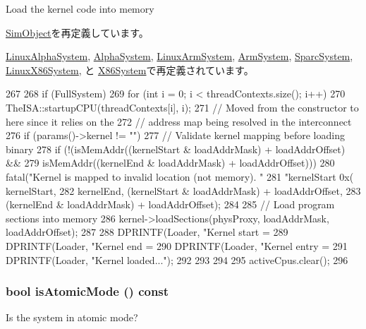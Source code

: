 Load the kernel code into memory

\hyperlink{classSimObject_a3c34ea9b29f410748d4435a667484924}{SimObject}を再定義しています。

\hyperlink{classLinuxAlphaSystem_a3c34ea9b29f410748d4435a667484924}{LinuxAlphaSystem}, \hyperlink{classAlphaSystem_a3c34ea9b29f410748d4435a667484924}{AlphaSystem}, \hyperlink{classLinuxArmSystem_a3c34ea9b29f410748d4435a667484924}{LinuxArmSystem}, \hyperlink{classArmSystem_a3c34ea9b29f410748d4435a667484924}{ArmSystem}, \hyperlink{classSparcSystem_a3c34ea9b29f410748d4435a667484924}{SparcSystem}, \hyperlink{classLinuxX86System_a3c34ea9b29f410748d4435a667484924}{LinuxX86System}, と \hyperlink{classX86System_a3c34ea9b29f410748d4435a667484924}{X86System}で再定義されています。


\begin{DoxyCode}
267 {
268     if (FullSystem) {
269         for (int i = 0; i < threadContexts.size(); i++)
270             TheISA::startupCPU(threadContexts[i], i);
271         // Moved from the constructor to here since it relies on the
272         // address map being resolved in the interconnect
276         if (params()->kernel != "")  {
277             // Validate kernel mapping before loading binary
278             if (!(isMemAddr((kernelStart & loadAddrMask) + loadAddrOffset) &&
279                      isMemAddr((kernelEnd & loadAddrMask) + loadAddrOffset))) {
280                 fatal("Kernel is mapped to invalid location (not memory). "
281                       "kernelStart 0x(%
      kernelStart,
282                       kernelEnd, (kernelStart & loadAddrMask) + loadAddrOffset,
283                       (kernelEnd & loadAddrMask) + loadAddrOffset);
284             }
285             // Load program sections into memory
286             kernel->loadSections(physProxy, loadAddrMask, loadAddrOffset);
287 
288             DPRINTF(Loader, "Kernel start = %
289             DPRINTF(Loader, "Kernel end   = %
290             DPRINTF(Loader, "Kernel entry = %
291             DPRINTF(Loader, "Kernel loaded...\n");
292         }
293     }
294 
295     activeCpus.clear();
296 }
\end{DoxyCode}
\hypertarget{classSystem_a6685592df58820e9bb30d94908c9881a}{
\subsubsection[{isAtomicMode}]{\setlength{\rightskip}{0pt plus 5cm}bool isAtomicMode () const}}
\label{classSystem_a6685592df58820e9bb30d94908c9881a}
Is the system in atomic mode?


